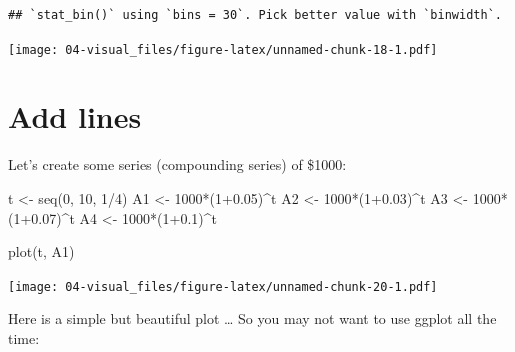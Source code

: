 \documentclass[
]{book}
\newenvironment{Shaded}{\begin{snugshade}}{\end{snugshade}}
\newcommand{\DecValTok}[1]{\textcolor[rgb]{0.00,0.00,0.81}{#1}}
\newcommand{\FloatTok}[1]{\textcolor[rgb]{0.00,0.00,0.81}{#1}}
\newcommand{\FunctionTok}[1]{\textcolor[rgb]{0.00,0.00,0.00}{#1}}
\newcommand{\NormalTok}[1]{#1}
\newcommand{\OtherTok}[1]{\textcolor[rgb]{0.56,0.35,0.01}{#1}}
\newcommand{\SpecialCharTok}[1]{\textcolor[rgb]{0.00,0.00,0.00}{#1}}
\begin{document}
\begin{verbatim}
## `stat_bin()` using `bins = 30`. Pick better value with `binwidth`.
\end{verbatim}

\texttt{[image: 04-visual\_files/figure-latex/unnamed-chunk-18-1.pdf]}

\hypertarget{add-lines}{%
\section{Add lines}\label{add-lines}}

Let's create some series (compounding series) of \$1000:

\begin{Shaded}
\begin{Highlighting}[]
\NormalTok{t }\OtherTok{\textless{}{-}} \FunctionTok{seq}\NormalTok{(}\DecValTok{0}\NormalTok{, }\DecValTok{10}\NormalTok{, }\DecValTok{1}\SpecialCharTok{/}\DecValTok{4}\NormalTok{)}
\NormalTok{A1 }\OtherTok{\textless{}{-}} \DecValTok{1000}\SpecialCharTok{*}\NormalTok{(}\DecValTok{1}\FloatTok{+0.05}\NormalTok{)}\SpecialCharTok{\^{}}\NormalTok{t}
\NormalTok{A2 }\OtherTok{\textless{}{-}} \DecValTok{1000}\SpecialCharTok{*}\NormalTok{(}\DecValTok{1}\FloatTok{+0.03}\NormalTok{)}\SpecialCharTok{\^{}}\NormalTok{t}
\NormalTok{A3 }\OtherTok{\textless{}{-}} \DecValTok{1000}\SpecialCharTok{*}\NormalTok{(}\DecValTok{1}\FloatTok{+0.07}\NormalTok{)}\SpecialCharTok{\^{}}\NormalTok{t}
\NormalTok{A4 }\OtherTok{\textless{}{-}} \DecValTok{1000}\SpecialCharTok{*}\NormalTok{(}\DecValTok{1}\FloatTok{+0.1}\NormalTok{)}\SpecialCharTok{\^{}}\NormalTok{t}
\end{Highlighting}
\end{Shaded}

\begin{Shaded}
\begin{Highlighting}[]
\FunctionTok{plot}\NormalTok{(t, A1)}
\end{Highlighting}
\end{Shaded}

\texttt{[image: 04-visual\_files/figure-latex/unnamed-chunk-20-1.pdf]}

Here is a simple but beautiful plot \ldots{} So you may not want to use ggplot all the time:
\end{document}
